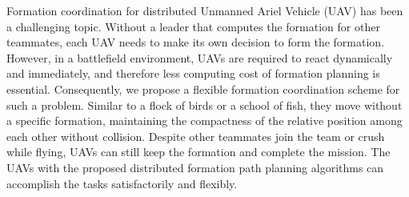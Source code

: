 Formation coordination for distributed Unmanned Ariel Vehicle (UAV) has been a challenging topic. Without a leader that computes the formation for other teammates, each UAV needs to make its own decision to form the formation. However, in a battlefield environment, UAVs are required to react dynamically and immediately, and therefore less computing cost of formation planning is essential. Consequently, we propose a flexible formation coordination scheme for such a problem. Similar to a flock of birds or a school of fish, they move without a specific formation, maintaining the compactness of the relative position among each other without collision. Despite other teammates join the team or crush while flying, UAVs can still keep the formation and complete the mission. The UAVs with the proposed distributed formation path planning algorithms can accomplish the tasks satisfactorily and flexibly.
\clearpage